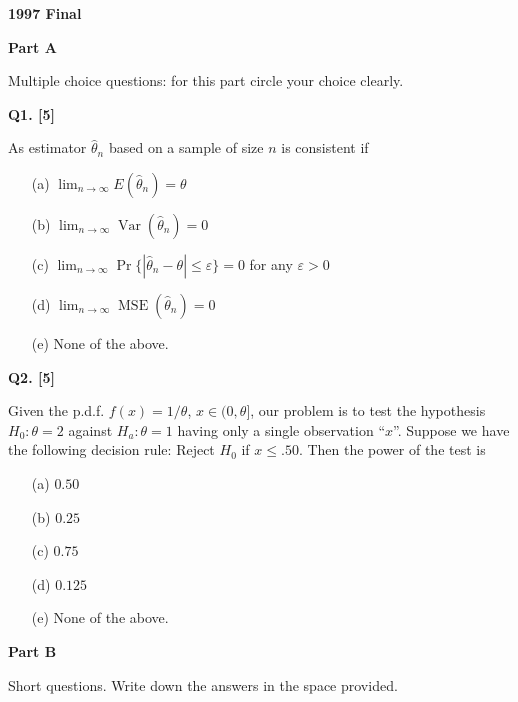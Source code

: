 \documentclass[11pt]{article}
\begin{document}
\begin{center}
    {\Large\bfseries 1997 Final}
\end{center}

\vspace{1em}

\begin{center}
\textbf{Part A}
\end{center}

\begingroup
\small
\setlength{\parskip}{0.1em}
Multiple choice questions: for this part circle your choice clearly.

\medskip
\textbf{Q1. [5]}

As estimator $\hat\theta_n$ based on a sample of size $n$ is consistent if
\begin{enumerate}
\setlength{\itemsep}{0pt}\setlength{\parsep}{0pt}\setlength{\topsep}{2pt}
\item[(a)] $\displaystyle\lim_{n\to\infty}E(\hat\theta_n)=\theta$
\item[(b)] $\displaystyle\lim_{n\to\infty}\operatorname{Var}(\hat\theta_n)=0$
\item[(c)] $\displaystyle\lim_{n\to\infty}\Pr\{|\hat\theta_n-\theta|\leq\varepsilon\}=0$ for any $\varepsilon>0$
\item[(d)] $\displaystyle\lim_{n\to\infty}\operatorname{MSE}(\hat\theta_n)=0$
\item[(e)] None of the above.
\end{enumerate}

\medskip
\textbf{Q2. [5]}

Given the p.d.f. $f(x)=1/\theta$, $x\in(0,\theta]$, our problem is to test the hypothesis $H_0:\theta=2$ against $H_a:\theta=1$ having only a single observation ``$x$''. Suppose we have the following decision rule: Reject $H_0$ if $x\leq .50$. Then the power of the test is
\begin{enumerate}
\setlength{\itemsep}{0pt}\setlength{\parsep}{0pt}\setlength{\topsep}{2pt}
\item[(a)] $0.50$
\item[(b)] $0.25$
\item[(c)] $0.75$
\item[(d)] $0.125$
\item[(e)] None of the above.
\end{enumerate}
\endgroup

\clearpage
\begin{center}
\textbf{Part B}
\end{center}

Short questions. Write down the answers in the space provided.
\end{document}
